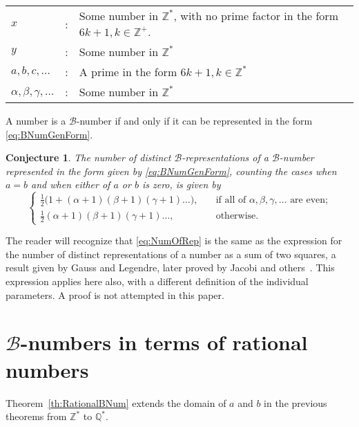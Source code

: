 \documentclass[reqno]{amsart}
\newtheorem{conjecture}{Conjecture}
\newcommand{\bnum}   {\ensuremath{\mathcal B}-number}
\newcommand{\brep}   {\ensuremath{\mathcal B}-representation}
\newcommand{\Positive}{\ensuremath{\mathbb{Z^+}}}
\newcommand{\Nonnegative}{\ensuremath{\mathbb{Z^*}}}
\newcommand{\NonnegativeRational}{\ensuremath{\mathbb{Q^*}}}
\begin{document}
\begin{tabular}{lcp{4in}}
  $x$ &:& Some number in \Nonnegative, with no
  prime factor in the form $6k+1, k \in \Positive$. \\
  $y$ &:& Some number in \Nonnegative \\
  $a, b, c,\ldots$ &:& A prime in the form $6k+1, k \in \Nonnegative$ \\
  $\alpha, \beta, \gamma, \ldots$ &:& Some number in \Nonnegative 
\end{tabular}

\vspace{10pt}

A number is a \bnum{} if and only if it can be represented
in the form \eqref{eq:BNumGenForm}.
\begin{conjecture}
  \label{th:BNumNumberOfRep}
  The number of distinct
  \brep{}s of a \bnum{} represented in the form given by \eqref{eq:BNumGenForm}, counting the cases when $a=b$ and when
  either of $a$ or $b$ is zero, is
  given by
  \begin{equation}
    \begin{cases}
      \frac{1}{2} \Big(1 + (\alpha+1)(\beta+1)(\gamma+1)\ldots\Big), & \quad
      \text{if all of } \alpha, \beta, \gamma, \ldots \text{ are even;} \\
      \frac{1}{2} (\alpha+1)(\beta+1)(\gamma+1)\ldots, & \quad
      \text{otherwise.}
    \end{cases}
    \label{eq:NumOfRep}
  \end{equation}
\end{conjecture}

The reader will recognize that \eqref{eq:NumOfRep} is the
same as the expression for the number of distinct
representations of a number as a sum of two squares, a
result given by Gauss and Legendre, later proved by Jacobi
and others~\cite{DIC1920}.  This expression applies here also,
with a different definition of the individual parameters.  A
proof is not attempted in this paper.

\section{\bnum{}s in terms of rational numbers}
Theorem~\ref{th:RationalBNum} 
extends the domain of $a$ and $b$ in the previous theorems
from \Nonnegative{} to \NonnegativeRational.
\end{document}
